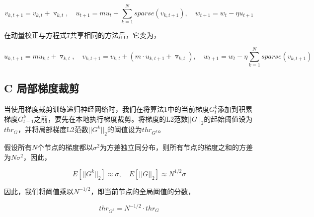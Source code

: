 \begin{equation}
	\label{eq:nonc}
	v_{k,t+1} = v_{k,t} + \triangledown_{k,t},\quad u_{t+1} = mu_{t} + \sum_{k=1}^{N} sparse\left( v_{k,t+1}\right) ,\quad  w_{t+1} = w_{t} - \eta u_{t+1}
\end{equation}

在动量校正与方程式7共享相同的方法后，它变为，

\begin{equation}
	\label{eq:nc}
	u_{k,t+1} = mu_{k,t}+ \triangledown_{k,t},\quad  v_{k,t+1} = v_{k,t} + \left(m\cdot u_{k,t+1} + \triangledown_{k,t}\right),\quad  w_{t+1} = w_{t} - \eta \sum_{k=1}^{N} sparse\left( v_{k,t+1}\right) 
\end{equation}

\subsection{C 局部梯度裁剪}
当使用梯度裁剪训练递归神经网络时，我们在将算法1中的当前梯度$G^k_t$添加到积累梯度$G^k_{t-1}$之前，要先在本地执行梯度裁剪。将梯度的L2范数$||G||_2$的起始阈值设为$thr_G$，并将局部梯度L2范数$||G^k||_2$的阈值设为$thr_{G^k}$。

假设所有$N$个节点的梯度都以$\sigma^2$为方差独立同分布，则所有节点的梯度之和的方差为$N\sigma^2$，因此，

\begin{equation}
  E\left[ ||G^k||_2 \right]\approx \sigma, \quad E\left[ ||G||_2 \right]\approx N^{1/2} \sigma
\end{equation}

因此，我们将阈值乘以$N^{-1/2}$，即当前节点的全局阈值的分数，

\begin{equation}
  thr_{G^k} = N^{-1/2}\cdot thr_{G}
\end{equation}

